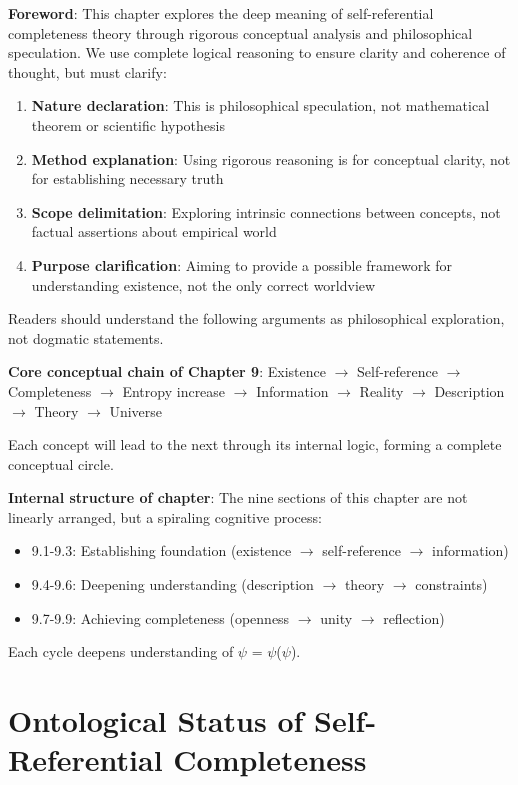 
\textbf{Foreword}: This chapter explores the deep meaning of self-referential completeness theory through rigorous conceptual analysis and philosophical speculation. We use complete logical reasoning to ensure clarity and coherence of thought, but must clarify:

\begin{enumerate}
\item \textbf{Nature declaration}: This is philosophical speculation, not mathematical theorem or scientific hypothesis
\item \textbf{Method explanation}: Using rigorous reasoning is for conceptual clarity, not for establishing necessary truth
\item \textbf{Scope delimitation}: Exploring intrinsic connections between concepts, not factual assertions about empirical world
\item \textbf{Purpose clarification}: Aiming to provide a possible framework for understanding existence, not the only correct worldview
\end{enumerate}

Readers should understand the following arguments as philosophical exploration, not dogmatic statements.

\textbf{Core conceptual chain of Chapter 9}:
Existence $\rightarrow$ Self-reference $\rightarrow$ Completeness $\rightarrow$ Entropy increase $\rightarrow$ Information $\rightarrow$ Reality $\rightarrow$ Description $\rightarrow$ Theory $\rightarrow$ Universe

Each concept will lead to the next through its internal logic, forming a complete conceptual circle.

\textbf{Internal structure of chapter}:
The nine sections of this chapter are not linearly arranged, but a spiraling cognitive process:
\begin{itemize}
\item 9.1-9.3: Establishing foundation (existence $\rightarrow$ self-reference $\rightarrow$ information)
\item 9.4-9.6: Deepening understanding (description $\rightarrow$ theory $\rightarrow$ constraints)
\item 9.7-9.9: Achieving completeness (openness $\rightarrow$ unity $\rightarrow$ reflection)
\end{itemize}

Each cycle deepens understanding of $\psi$ = $\psi$($\psi$).

\section{Ontological Status of Self-Referential Completeness}
\label{sec:ch09_philosophy:ontological-status-of-self-referential-completeness}

